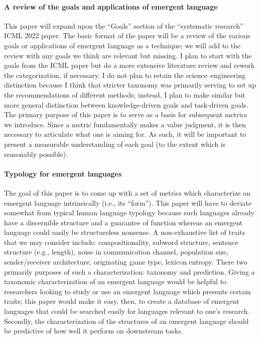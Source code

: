 

\paragraph{A review of the goals and applications of emergent language}
This paper will expand upon the ``Goals'' section of the ``systematic research'' ICML 2022 paper.
The basic format of the paper will be a review of the various goals or applications of emergent language as a technique; we will add to the review with any goals we think are relevant but missing.
I plan to start with the goals from the ICML paper but do a more extensive literature review and rework the categorization, if necessary.
I do not plan to retain the science--engineering distinction because I think that stricter taxonomy was primarily serving to set up the recommendations of different methods; instead, I plan to make similar but more general distinction between knowledge-driven goals and task-driven goals. 
The primary purpose of this paper is to serve as a basis for subsequent metrics we introduce.
Since a metric fundamentally makes a value judgment, it is then necessary to articulate what one is aiming for.
As such, it will be important to present a measurable understanding of each goal (to the extent which is reasonably possible).

\paragraph{Typology for emergent languages}
The goal of this paper is to come up with a set of metrics which characterize an emergent language intrinsically (i.e., its ``form'').
This paper will have to deviate somewhat from typical human language typology because such languages already have a discernible structure and a guarantee of function whereas an emergent language could easily be structureless nonsense.
A non-exhaustive list of traits that we may consider include:
    compositionality, subword structure, sentence structure (e.g., length), noise in communication channel, population size, sender/receiver architecture, originating game type, lexicon entropy.
There two primarily purposes of such a characterization: taxonomy and prediction.
Giving a taxonomic characterization of an emergent language would be helpful to researchers looking to study or use an emergent language which presents certain traits; this paper would make it easy, then, to create a database of emergent languages that could be searched easily for languages relevant to one's research.
Secondly, the characterization of the structures of an emergent language should be predictive of how well it perform on downstream tasks.

